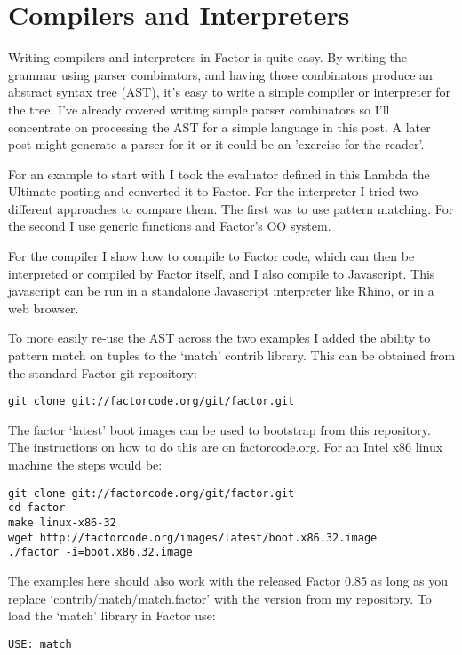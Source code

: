 \chapter{Compilers and Interpreters}\label{compilers}

Writing compilers and interpreters in Factor is quite easy. By writing
the grammar using parser combinators, and having those combinators
produce an abstract syntax tree (AST), it's easy to write a simple
compiler or interpreter for the tree. I've already covered writing
simple parser combinators so I'll concentrate on processing the AST
for a simple language in this post. A later post might generate a
parser for it or it could be an 'exercise for the reader'.

For an example to start with I took the evaluator defined in this
Lambda the Ultimate posting and converted it to Factor. For the
interpreter I tried two different approaches to compare them. The
first was to use pattern matching. For the second I use generic
functions and Factor's OO system.

For the compiler I show how to compile to Factor code, which can then
be interpreted or compiled by Factor itself, and I also compile to
Javascript. This javascript can be run in a standalone Javascript
interpreter like Rhino, or in a web browser.

To more easily re-use the AST across the two examples I added the
ability to pattern match on tuples to the `match' contrib
library. This can be obtained from the standard Factor git
repository:
\begin{verbatim}
git clone git://factorcode.org/git/factor.git
\end{verbatim}


The factor `latest' boot images can be used to bootstrap from this
repository. The instructions on how to do this are on
factorcode.org. For an Intel x86 linux machine the steps would be:

\begin{verbatim}
git clone git://factorcode.org/git/factor.git
cd factor
make linux-x86-32
wget http://factorcode.org/images/latest/boot.x86.32.image
./factor -i=boot.x86.32.image
\end{verbatim}

The examples here should also work with the released Factor 0.85 as
long as you replace `contrib/match/match.factor' with the version from
my repository. To load the `match' library in Factor use:

\begin{verbatim}
USE: match
\end{verbatim}

